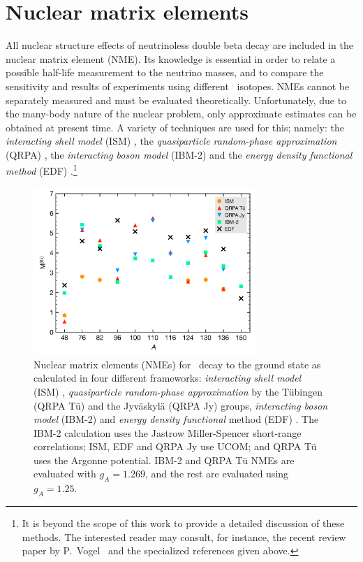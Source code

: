 \documentclass{PoS}
\begin{document}
\section{Nuclear matrix elements} \label{sec:NME}
All nuclear structure effects of neutrinoless double beta decay are included in the nuclear matrix element (NME). Its knowledge is essential in order to relate a possible half-life measurement to the neutrino masses, and to compare the sensitivity and results of experiments using different \bb\ isotopes. NMEs cannot be separately measured and must be evaluated theoretically. Unfortunately, due to the many-body nature of the nuclear problem, only approximate estimates can be obtained at present time. A variety of techniques are used for this; namely: the \emph{interacting shell model} (ISM) \cite{Caurier:2007wq, Menendez:2008jp}, the \emph{quasiparticle random-phase approximation} (QRPA) \cite{Rodin:2006yk, Kortelainen:2007rn}, the \emph{interacting boson model} (IBM-2) \cite{Barea:2013bz} and the \emph{energy density functional method} (EDF) \cite{Rodriguez:2010mn, Vaquero:2014dna}.\footnote{It is beyond the scope of this work to provide a detailed discussion of these methods. The interested reader may consult, for instance, the recent review paper by P.~Vogel~\cite{Vogel:2012ja} and the specialized references given above.}

\begin{figure}
\centering
\includegraphics[width=0.75\textwidth]{img/NME.pdf}
\caption{Nuclear matrix elements (NMEs) for \bbonu\ decay to the ground state as calculated in four different frameworks: \emph{interacting shell model} (ISM) \cite{Menendez:2008jp}, \emph{quasiparticle random-phase approximation} by the T\"ubingen (QRPA T\"u) \cite{Simkovic:2013qiy} and the Jyv\"askyl\"a (QRPA Jy) \cite{Suhonen:2012ii} groups, \emph{interacting boson model} (IBM-2) \cite{Barea:2013bz} and \emph{energy density functional} method (EDF) \cite{Vaquero:2014dna}. 
The IBM-2 calculation uses the Jastrow Miller-Spencer short-range correlations; ISM, EDF and QRPA Jy use UCOM; and QRPA T\"u uses the Argonne potential. 
IBM-2 and QRPA T\"u NMEs are evaluated with $g_{A}=1.269$, and the rest are evaluated using $g_{A}=1.25$.}\label{fig:NME}
\end{figure}
\end{document}
